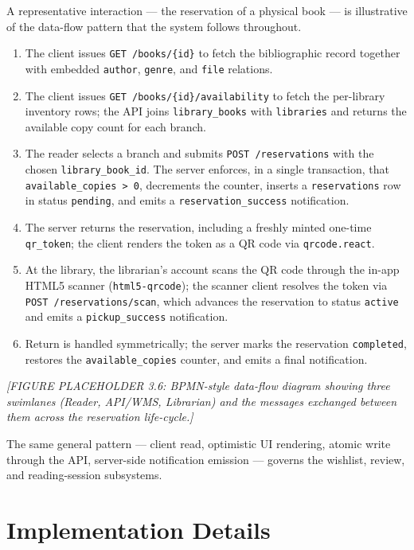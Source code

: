 \documentclass[12pt,a4paper]{report}
\begin{document}
A representative interaction --- the reservation of a physical book ---
is illustrative of the data-flow pattern that the system follows
throughout.

\begin{enumerate}[leftmargin=*]
    \item The client issues \texttt{GET /books/\{id\}} to fetch the
    bibliographic record together with embedded \texttt{author},
    \texttt{genre}, and \texttt{file} relations.
    \item The client issues \texttt{GET /books/\{id\}/availability} to
    fetch the per-library inventory rows; the API joins
    \texttt{library\_books} with \texttt{libraries} and returns the
    available copy count for each branch.
    \item The reader selects a branch and submits
    \texttt{POST /reservations} with the chosen
    \texttt{library\_book\_id}. The server enforces, in a single
    transaction, that \texttt{available\_copies > 0}, decrements the
    counter, inserts a \texttt{reservations} row in status
    \texttt{pending}, and emits a \texttt{reservation\_success}
    notification.
    \item The server returns the reservation, including a freshly minted
    one-time \texttt{qr\_token}; the client renders the token as a QR
    code via \texttt{qrcode.react}.
    \item At the library, the librarian's account scans the QR code
    through the in-app HTML5 scanner (\texttt{html5-qrcode}); the scanner
    client resolves the token via \texttt{POST /reservations/scan},
    which advances the reservation to status \texttt{active} and emits a
    \texttt{pickup\_success} notification.
    \item Return is handled symmetrically; the server marks the
    reservation \texttt{completed}, restores the
    \texttt{available\_copies} counter, and emits a final notification.
\end{enumerate}

\textit{[FIGURE PLACEHOLDER 3.6: BPMN-style data-flow diagram showing
three swimlanes (Reader, API/WMS, Librarian) and the messages exchanged
between them across the reservation life-cycle.]}

The same general pattern --- client read, optimistic UI rendering, atomic
write through the API, server-side notification emission --- governs the
wishlist, review, and reading-session subsystems.

\section{Implementation Details}
\end{document}
